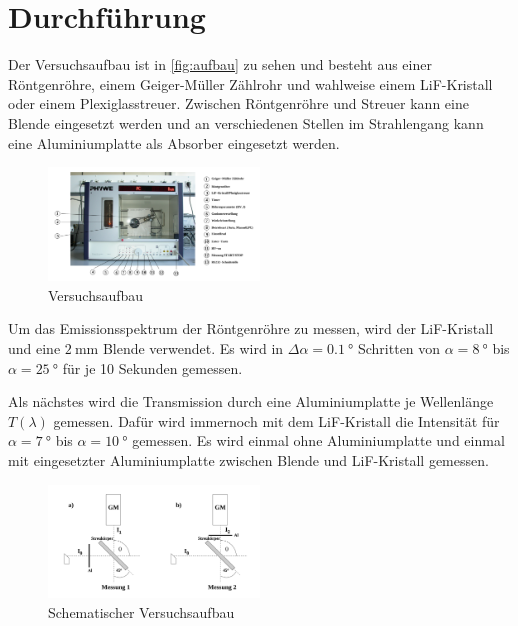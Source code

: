 \newpage
\section{Durchführung}
\label{sec:Durchführung}


Der Versuchsaufbau ist in \autoref{fig:aufbau} zu sehen und besteht aus einer Röntgenröhre, einem Geiger-Müller Zählrohr und wahlweise einem LiF-Kristall oder einem Plexiglasstreuer.
Zwischen Röntgenröhre und Streuer kann eine Blende eingesetzt werden und an verschiedenen Stellen im Strahlengang kann eine Aluminiumplatte als Absorber eingesetzt werden.

\begin{figure}
    \centering
    \includegraphics[width=0.5\textwidth]{images/bild_3.png}
    \caption{Versuchsaufbau}
    \label{fig:aufbau}
\end{figure}

Um das Emissionsspektrum der Röntgenröhre zu messen, wird der LiF-Kristall und eine $\SI{2}{\milli\metre}$ Blende verwendet.
Es wird in $\Delta \alpha = \SI{0.1}{\degree}$ Schritten von $\alpha=\SI{8}{\degree}$ bis $\alpha = \SI{25}{\degree}$ für je 10 Sekunden gemessen.

\FloatBarrier

Als nächstes wird die Transmission durch eine Aluminiumplatte je Wellenlänge $T(\lambda)$ gemessen.
Dafür wird immernoch mit dem LiF-Kristall die Intensität für $\alpha = \SI{7}{\degree}$ bis $\alpha = \SI{10}{\degree}$ gemessen.
Es wird einmal ohne Aluminiumplatte und einmal mit eingesetzter Aluminiumplatte zwischen Blende und LiF-Kristall gemessen.

\begin{figure}
    \centering
    \includegraphics[width=0.5\textwidth]{images/bild_4.png}
    \caption{Schematischer Versuchsaufbau}
    \label{fig:schema}
\end{figure}

